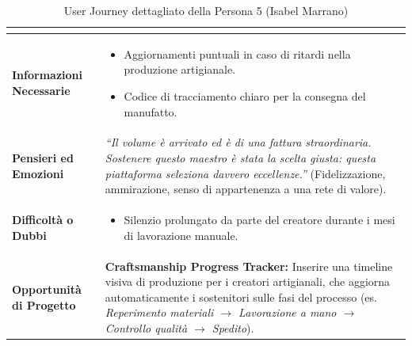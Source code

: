 \documentclass[11pt,a4paper]{article}
\begin{document}
\begin{table}[h!]
\begin{tabular}{|p{3.2cm}|p{11.8cm}|}
\begin{itemize}[leftmargin=*,nosep]
\end{itemize} \\ \hline
\textbf{Informazioni Necessarie} &
\begin{itemize}[leftmargin=*,nosep]
    \item Aggiornamenti puntuali in caso di ritardi nella produzione artigianale.
    \item Codice di tracciamento chiaro per la consegna del manufatto.
\end{itemize} \\ \hline
\textbf{Pensieri ed Emozioni} &
\textit{``Il volume è arrivato ed è di una fattura straordinaria. Sostenere questo maestro è stata la scelta giusta: questa piattaforma seleziona davvero eccellenze.''} (Fidelizzazione, ammirazione, senso di appartenenza a una rete di valore). \\ \hline
\textbf{Difficoltà o Dubbi} &
\begin{itemize}[leftmargin=*,nosep]
    \item Silenzio prolungato da parte del creatore durante i mesi di lavorazione manuale.
\end{itemize} \\ \hline
\textbf{Opportunità di Progetto} &
\textbf{Craftsmanship Progress Tracker:} Inserire una timeline visiva di produzione per i creatori artigianali, che aggiorna automaticamente i sostenitori sulle fasi del processo (es. \textit{Reperimento materiali $\rightarrow$ Lavorazione a mano $\rightarrow$ Controllo qualità $\rightarrow$ Spedito}). \\ \hline
\end{tabular}
\caption{User Journey dettagliato della Persona 5 (Isabel Marrano)}
\label{tab:user_journey_isabel}
\end{table}
\end{document}
